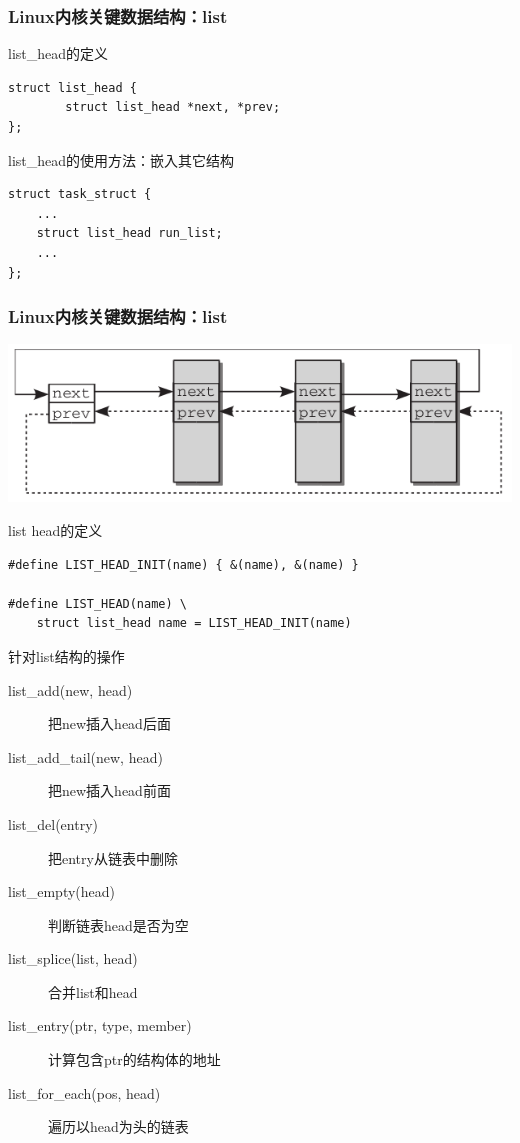 \documentclass[xcolor=svgnames]{beamer}
\begin{document}
\begin{CJK*}{UTF8}{gbsn}
\begin{frame}[fragile]
\end{frame}

\begin{frame}[fragile]%
\frametitle{Linux内核关键数据结构：list}
\begin{block}{list\_head的定义}
\begin{verbatim}
struct list_head {
        struct list_head *next, *prev;
};
\end{verbatim}
\end{block}

\begin{block}{list\_head的使用方法：嵌入其它结构}
\begin{verbatim}
struct task_struct {
    ...
    struct list_head run_list;
    ...
};
\end{verbatim}
\end{block}

\end{frame}


\begin{frame}[fragile]
\frametitle{Linux内核关键数据结构：list}
\includegraphics[width=1.0\textwidth]{list.png}
\begin{block}{list head的定义}
\begin{verbatim}
#define LIST_HEAD_INIT(name) { &(name), &(name) }

#define LIST_HEAD(name) \
    struct list_head name = LIST_HEAD_INIT(name)
\end{verbatim}
\end{block}
\end{frame}

\begin{frame}{针对list结构的操作}
\begin{description}
\item[list\_add(new, head)] 把new插入head后面
\item[list\_add\_tail(new, head)] 把new插入head前面
\item[list\_del(entry)] 把entry从链表中删除
\item[list\_empty(head)] 判断链表head是否为空
\item[list\_splice(list, head)] 合并list和head
\item[list\_entry(ptr, type, member)] 计算包含ptr的结构体的地址
\item[list\_for\_each(pos, head)] 遍历以head为头的链表
\end{description}
\end{frame}


\end{CJK*}
\end{document}
